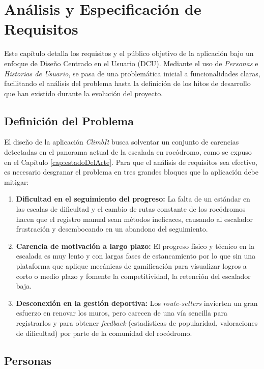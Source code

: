 \chapter{Análisis y Especificación de Requisitos}
\label{cap:analisisRequisitos}

Este capítulo detalla los requisitos y el público objetivo de la aplicación bajo un enfoque de Diseño Centrado en el Usuario (DCU). Mediante el uso de \textit{Personas} e \textit{Historias de Usuario}, se pasa de una problemática inicial a funcionalidades claras, facilitando el análisis del problema hasta la definición de los hitos de desarrollo que han existido durante la evolución del proyecto.

\section{Definición del Problema}

El diseño de la aplicación \textit{ClimbIt} busca solventar un conjunto de carencias detectadas en el panorama actual de la escalada en rocódromo, como se expuso en el Capítulo \ref{cap:estadoDelArte}. Para que el análisis de requisitos sea efectivo, es necesario desgranar el problema en tres grandes bloques que la aplicación debe mitigar:

\begin{enumerate}
    \item \textbf{Dificultad en el seguimiento del progreso:} La falta de un estándar en las escalas de dificultad y el cambio de rutas constante de los rocódromos hacen que el registro manual sean métodos ineficaces, causando al escalador frustración y desembocando en un abandono del seguimiento.
    \item \textbf{Carencia de motivación a largo plazo:} El progreso físico y técnico en la escalada es muy lento y con largas fases de estancamiento por lo que sin una plataforma que aplique mecánicas de gamificación para visualizar logros a corto o medio plazo y fomente la competitividad, la retención del escalador baja.
    \item \textbf{Desconexión en la gestión deportiva:} Los \textit{route-setters} invierten un gran esfuerzo en renovar los muros, pero carecen de una vía sencilla para registrarlos y para obtener \textit{feedback} (estadísticas de popularidad, valoraciones de dificultad) por parte de la comunidad del rocódromo.
\end{enumerate}

\section{Personas}

